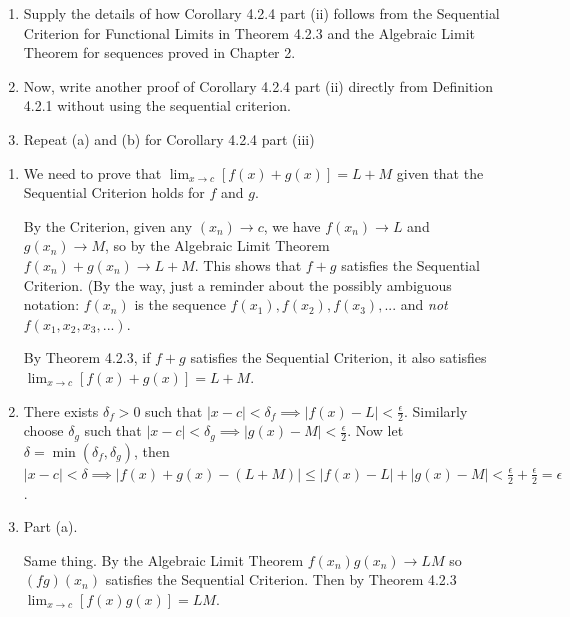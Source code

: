 \documentclass{oxmathproblems}
\begin{document}
\begin{questions}

\miquestion
\begin{enumerate}[label=(\alph*)]
  \item Supply the details of how Corollary 4.2.4 part (ii) follows from the Sequential Criterion for Functional Limits in Theorem 4.2.3 and the Algebraic Limit Theorem
  for sequences proved in Chapter 2.
  \item Now, write another proof of Corollary 4.2.4 part (ii) directly from Definition 4.2.1 without using the sequential criterion.
  \item Repeat (a) and (b) for Corollary 4.2.4 part (iii)
\end{enumerate}

\begin{solution}
  \begin{enumerate}[label=(\alph*)]
    \item We need to prove that $\lim_{x \to c} [f(x) + g(x)] = L + M$ given that the Sequential Criterion holds for $f$ and $g$.
    
    By the Criterion, given any $(x_{n}) \to c$, we have $f(x_{n}) \to L$ and $g(x_{n}) \to M$, so by the Algebraic Limit Theorem
    $f(x_{n}) + g(x_{n}) \to L + M$. This shows that $f+g$ satisfies the Sequential Criterion. (By the way, just a reminder about the possibly ambiguous notation: $f(x_{n})$ is the sequence
    $f(x_{1}), f(x_{2}), f(x_{3}), ...$ and \textit{not} $f(x_{1}, x_{2}, x_{3}, ...)$.

    By Theorem 4.2.3, if $f + g$ satisfies the Sequential Criterion, it also satisfies $\lim_{x \to c} [f(x) + g(x)] = L + M$.

    \item There exists $\delta_{f} > 0$ such that $|x-c| < \delta_{f} \implies |f(x)-L| < \frac{\epsilon}{2}$. Similarly choose $\delta_{g}$
    such that $|x-c| < \delta_{g} \implies |g(x) - M| < \frac{\epsilon}{2}$. Now let $\delta = \min(\delta_{f}, \delta_{g})$, then
    $|x-c| < \delta \implies |f(x)+g(x) - (L+M)| \leq |f(x)-L| + |g(x)-M| < \frac{\epsilon}{2} + \frac{\epsilon}{2} = \epsilon$.
  
    \item Part (a).
    
    Same thing. By the Algebraic Limit Theorem $f(x_{n})g(x_{n}) \to LM$ so $(fg)(x_{n})$ satisfies the Sequential Criterion. Then by Theorem 4.2.3
    $\lim_{x \to c}[f(x)g(x)] = LM$.


\end{enumerate}
\end{solution}
\end{questions}
\end{document}
